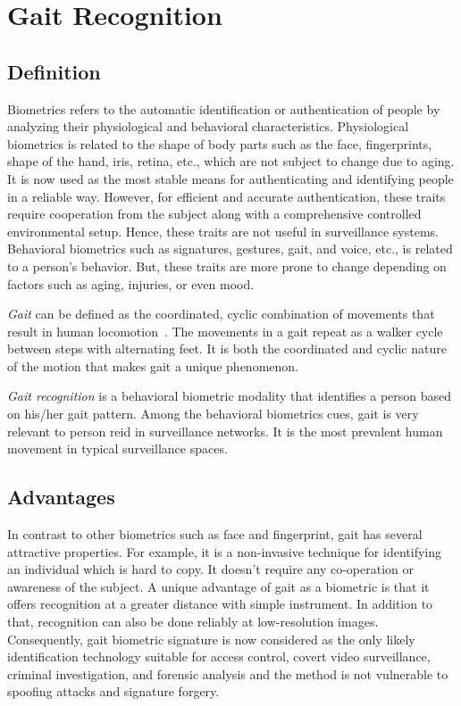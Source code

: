 \section{Gait Recognition}
\subsection{Definition}
Biometrics refers to the automatic identification or authentication of people by analyzing their physiological and behavioral characteristics. Physiological biometrics is related to the shape of body parts such as the face, fingerprints, shape of the hand, iris, retina, etc., which are not subject to change due to aging. It is now used as the most stable means for authenticating and identifying people in a reliable way. However, for efficient and accurate authentication, these traits require cooperation from the subject along with a comprehensive controlled environmental setup. Hence, these traits are not useful in surveillance systems. Behavioral biometrics such as signatures, gestures, gait, and voice, etc., is related to a person’s behavior. But, these traits are more prone to change depending on factors such as aging, injuries, or even mood. 

\textit{Gait} can be defined as the coordinated, cyclic combination of movements that result in human locomotion~\cite{Boyd_05}. The movements in a gait repeat as a walker cycle between steps with alternating feet. It is both the coordinated and cyclic nature of the motion that makes gait a unique phenomenon.

\textit{Gait recognition} is a behavioral biometric modality that identifies a person based on his/her gait pattern. Among the behavioral biometrics cues, gait is very relevant to person \gls{reid} in surveillance networks. It is the most prevalent human movement in typical surveillance spaces. 


\subsection{Advantages}
In contrast to other biometrics such as face and fingerprint, gait has several attractive properties. For example, it is a non-invasive technique for identifying an individual which is hard to copy. It doesn't require any co-operation or awareness of the subject. A unique advantage of gait as a biometric is that it offers recognition at a greater distance with simple instrument. In addition to that, recognition can also be done reliably at low-resolution images. Consequently, gait biometric signature is now considered as the only likely identification technology suitable for access control, covert video surveillance, criminal investigation, and forensic analysis and the method is not vulnerable to spoofing attacks and signature forgery.


